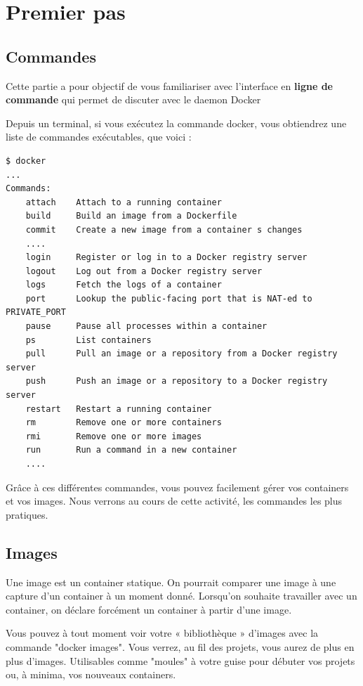 \documentclass[french, 12pt]{article}%
\newcommand{\titreencadre}{Titre}
\newenvironment{encadre}[1]{\renewcommand{\titreencadre}{#1}
	\begin{mdframed}[style=encadrestyle]
	\vspace{0.5\baselineskip}
	}{%
	\end{mdframed}}
\begin{document}
\section{Premier pas}

\subsection{Commandes}
Cette partie a pour objectif de vous familiariser avec l'interface en \textbf{ligne de commande} qui permet de discuter avec le daemon Docker 


Depuis un terminal, si vous exécutez la commande docker, vous obtiendrez une liste de commandes exécutables, que voici :


\begin{lstlisting}
$ docker
...
Commands:
    attach    Attach to a running container
    build     Build an image from a Dockerfile
    commit    Create a new image from a container s changes
	....
    login     Register or log in to a Docker registry server
    logout    Log out from a Docker registry server
    logs      Fetch the logs of a container
    port      Lookup the public-facing port that is NAT-ed to PRIVATE_PORT
    pause     Pause all processes within a container
    ps        List containers
    pull      Pull an image or a repository from a Docker registry server
    push      Push an image or a repository to a Docker registry server
    restart   Restart a running container
    rm        Remove one or more containers
    rmi       Remove one or more images
    run       Run a command in a new container
    ....
\end{lstlisting}

Grâce à ces différentes commandes, vous pouvez facilement gérer vos containers et vos images.  Nous verrons au cours de cette activité, les commandes les plus pratiques.


\subsection{Images}

\begin{encadre}{Image}
Une image est un container statique. On pourrait comparer une image à une capture d'un container à un moment donné. Lorsqu'on souhaite travailler avec un container, on déclare forcément un container à partir d'une image.
\end{encadre}

Vous pouvez à tout moment voir votre « bibliothèque » d'images avec la commande "docker images". Vous verrez, au fil des projets, vous aurez de plus en plus d'images. Utilisables comme "moules" à votre guise pour débuter vos projets ou, à minima, vos nouveaux containers.
\end{document}
